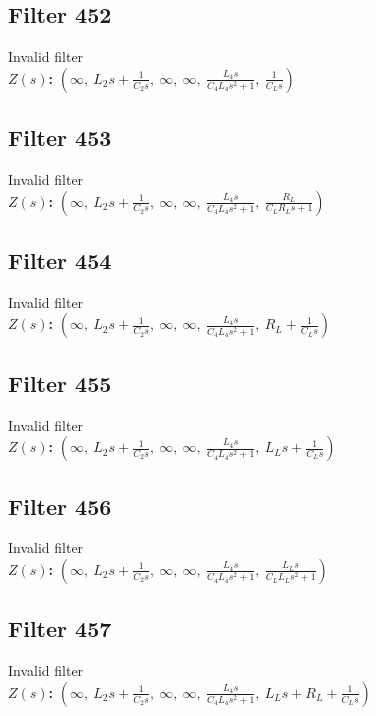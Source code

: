\documentclass{article}
\begin{document}
\subsection*{Filter 452}
Invalid filter \\ 
\textbf{$Z(s)$:} $\left( \infty, \  L_{2} s + \frac{1}{C_{2} s}, \  \infty, \  \infty, \  \frac{L_{4} s}{C_{4} L_{4} s^{2} + 1}, \  \frac{1}{C_{L} s}\right)$ \\ 
\subsection*{Filter 453}
Invalid filter \\ 
\textbf{$Z(s)$:} $\left( \infty, \  L_{2} s + \frac{1}{C_{2} s}, \  \infty, \  \infty, \  \frac{L_{4} s}{C_{4} L_{4} s^{2} + 1}, \  \frac{R_{L}}{C_{L} R_{L} s + 1}\right)$ \\ 
\subsection*{Filter 454}
Invalid filter \\ 
\textbf{$Z(s)$:} $\left( \infty, \  L_{2} s + \frac{1}{C_{2} s}, \  \infty, \  \infty, \  \frac{L_{4} s}{C_{4} L_{4} s^{2} + 1}, \  R_{L} + \frac{1}{C_{L} s}\right)$ \\ 
\subsection*{Filter 455}
Invalid filter \\ 
\textbf{$Z(s)$:} $\left( \infty, \  L_{2} s + \frac{1}{C_{2} s}, \  \infty, \  \infty, \  \frac{L_{4} s}{C_{4} L_{4} s^{2} + 1}, \  L_{L} s + \frac{1}{C_{L} s}\right)$ \\ 
\subsection*{Filter 456}
Invalid filter \\ 
\textbf{$Z(s)$:} $\left( \infty, \  L_{2} s + \frac{1}{C_{2} s}, \  \infty, \  \infty, \  \frac{L_{4} s}{C_{4} L_{4} s^{2} + 1}, \  \frac{L_{L} s}{C_{L} L_{L} s^{2} + 1}\right)$ \\ 
\subsection*{Filter 457}
Invalid filter \\ 
\textbf{$Z(s)$:} $\left( \infty, \  L_{2} s + \frac{1}{C_{2} s}, \  \infty, \  \infty, \  \frac{L_{4} s}{C_{4} L_{4} s^{2} + 1}, \  L_{L} s + R_{L} + \frac{1}{C_{L} s}\right)$ \\ 
\end{document}
